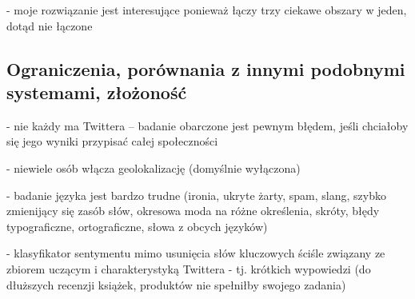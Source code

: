 - moje rozwiązanie jest interesujące ponieważ łączy 
trzy ciekawe obszary w jeden, dotąd nie łączone

\subsection{Ograniczenia, porównania z innymi podobnymi systemami, złożoność}
- nie każdy ma Twittera -- badanie obarczone jest pewnym błędem,
jeśli chciałoby się jego wyniki przypisać całej społeczności

- niewiele osób włącza geolokalizację (domyślnie wyłączona)

- badanie języka jest bardzo trudne (ironia, ukryte żarty, spam, slang, 
szybko zmienijący się zasób słów, okresowa moda na różne określenia, 
skróty, błędy typograficzne, ortograficzne, słowa z obcych języków)


- klasyfikator sentymentu mimo usunięcia słów kluczowych ściśle związany
ze zbiorem uczącym i charakterystyką Twittera - tj. krótkich wypowiedzi 
(do dłuższych recenzji książek, produktów nie spełniłby swojego zadania)